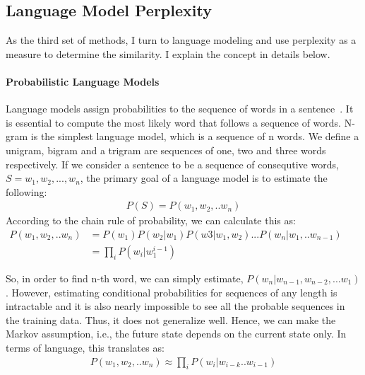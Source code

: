 \subsection{Language Model Perplexity} 

As the third set of methods, I turn to language modeling and use perplexity as a measure to determine the similarity. I explain the concept in details below.

\paragraph*{Probabilistic Language Models}

Language models assign probabilities to the sequence of words in a sentence~\citep{jurafsky2014speech}. It is essential to compute the most likely word that follows a sequence of words. N-gram is the simplest language model, which is a sequence of n words. We define a unigram, bigram and a trigram are sequences of one, two and three words respectively. If we consider a sentence to be a sequence of consequtive words,  $S = {w_1,w_2,...,w_n}$, the primary goal of a language model is to estimate the following:
\begin{align}
    P(S) = P(w_1,w_2,..w_n)
\end{align}
According to the chain rule of probability, we can calculate this as:
\begin{equation}
    \begin{aligned}
        P(w_1,w_2,..w_n) &= P(w_1)P(w_2|w_1)P(w3|w_1,w_2) ... P(w_n|w_1,..w_{n-1})&&\\
     &= \prod_i P(w_i|w_{1}^{i-1})&&
    \end{aligned}
\end{equation}

So, in order to find n-th word, we can simply estimate, $P(w_n|w_{n-1}, w_{n-2}, ... w_1)$. However, estimating conditional probabilities for sequences of any length is intractable and it is also nearly impossible to see all the probable sequences in the training data. Thus, it does not generalize well. Hence, we can make the Markov assumption, i.e., the future state depends on the current state only. In terms of language, this translates as:
\begin{align}
    P(w_1,w_2,..w_n) \approx \prod_i P(w_i|w_{i-k}..w_{i-1})
\end{align}

